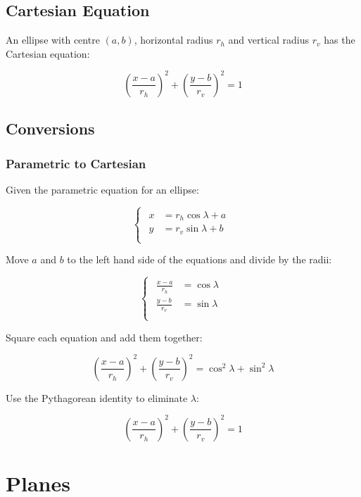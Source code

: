 \documentclass[a4paper,11pt]{article}
\begin{document}
\subsection{Cartesian Equation}

An ellipse with centre $(a, b)$, horizontal radius $r_h$ and vertical radius
$r_v$ has the Cartesian equation:

$$
(\frac{x - a}{r_h})^2 + (\frac{y - b}{r_v})^2 = 1
$$


\subsection{Conversions}

\subsubsection{Parametric to Cartesian}

Given the parametric equation for an ellipse:

$$
\begin{cases}
\begin{aligned}
x & = r_h \cos{\lambda} + a \\
y & = r_v \sin{\lambda} + b \\
\end{aligned}
\end{cases}
$$

Move $a$ and $b$ to the left hand side of the equations and divide by the
radii:

$$
\begin{cases}
\begin{aligned}
\frac{x - a}{r_h} & = \cos{\lambda} \\
\frac{y - b}{r_v} & = \sin{\lambda} \\
\end{aligned}
\end{cases}
$$

Square each equation and add them together:

$$
(\frac{x - a}{r_h})^2 + (\frac{y - b}{r_v})^2 = \cos^2{\lambda} + \sin^2{\lambda}
$$

Use the Pythagorean identity to eliminate $\lambda$:

$$
(\frac{x - a}{r_h})^2 + (\frac{y - b}{r_v})^2 = 1
$$




\section{Planes}
\end{document}
